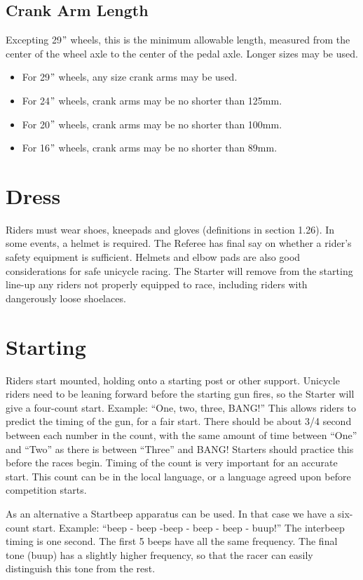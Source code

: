 \subsection{Crank Arm Length}
Excepting 29$"$ wheels, this is the minimum allowable length, measured from the center of the wheel axle to the center of the pedal axle.
Longer sizes may be used.
\begin{itemize}
\item For 29$"$ wheels, any size crank arms may be used.
\item For 24$"$ wheels, crank arms may be no shorter than 125mm.
\item For 20$"$ wheels, crank arms may be no shorter than 100mm.
\item For 16$"$ wheels, crank arms may be no shorter than 89mm.
\end{itemize}

\section{Dress}
Riders must wear shoes, kneepads and gloves (definitions in section 1.26). %
In some events, a helmet is required.
The Referee has final say on whether a rider's safety equipment is sufficient.
Helmets and elbow pads are also good considerations for safe unicycle racing.
The Starter will remove from the starting line-up any riders not properly equipped to race, including riders with dangerously loose shoelaces.

\section{Starting}
Riders start mounted, holding onto a starting post or other support.
Unicycle riders need to be leaning forward before the starting gun fires, so the Starter will give a four-count start.
Example: ``One, two, three, BANG!'' This allows riders to predict the timing of the gun, for a fair start.
There should be about 3/4 second between each number in the count, with the same amount of time between ``One'' and ``Two'' as there is between ``Three'' and BANG! Starters should practice this before the races begin.
Timing of the count is very important for an accurate start.
This count can be in the local language, or a language agreed upon before competition starts.

As an alternative a Startbeep apparatus can be used.
In that case we have a six-count start.
Example: ``beep - beep -beep - beep - beep - buup!'' The interbeep timing is one second.
The first 5 beeps have all the same frequency.
The final tone (buup) has a slightly higher frequency, so that the racer can easily distinguish this tone from the rest.

